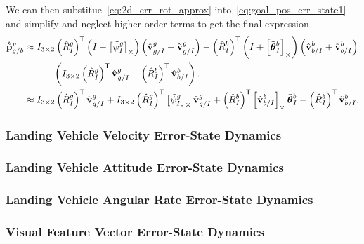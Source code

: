 We can then substitue~\eqref{eq:2d_err_rot_approx}
into~\eqref{eq:goal_pos_err_state1} and simplify and neglect higher-order terms
to get the final expression
\begin{align}
  \dot{\tilde{\boldsymbol{\mathrm{p}}}}_{g/b}^{v}
  &\approx
  \label{eq:goal_pos_err_state1}
  I_{3 \times 2} \left( \hat{R}_{I}^{g} \right)^{\mathsf{T}}
  \left( I - \left[ \tilde{\psi}_I^g \right]_{\times} \right)
  \left( \hat{\boldsymbol{\mathrm{v}}}_{g/I}^{g} + \tilde{\boldsymbol{\mathrm{v}}}_{g/I}^{g} \right)
  - \left( \hat{R}_{I}^{b} \right)^{\mathsf{T}}
  \left( I + \left[ \tilde{\boldsymbol{\mathrm{\theta}}}_I^b \right]_{\times} \right)
  \left( \hat{\boldsymbol{\mathrm{v}}}_{b/I}^{b} + \tilde{\boldsymbol{\mathrm{v}}}_{b/I}^{b} \right) \\
  & \qquad -
  \left(
  I_{3 \times 2} \left( \hat{R}_{I}^{g} \right)^{\mathsf{T}}
  \hat{\boldsymbol{\mathrm{v}}}_{g/I}^{g} - \left( \hat{R}_{I}^{b} \right)^{\mathsf{T}}
  \hat{\boldsymbol{\mathrm{v}}}_{b/I}^{b}
  \right). \nonumber \\
  &\approx
  \label{eq:goal_pos_err_state1}
  I_{3 \times 2} \left( \hat{R}_{I}^{g} \right)^{\mathsf{T}}
  \tilde{\boldsymbol{\mathrm{v}}}_{g/I}^g
  +
  I_{3 \times 2} \left( \hat{R}_{I}^{g} \right)^{\mathsf{T}}
  \left[  \tilde{\psi}_I^g  \right]_{\times} \hat{\boldsymbol{\mathrm{v}}}_{g/I}^g
  +
  \left( \hat{R}_{I}^{b} \right)^{\mathsf{T}} \left[  \hat{\boldsymbol{\mathrm{v}}}_{b/I}^{b}  \right]_{\times} 
  \tilde{\boldsymbol{\mathrm{\theta}}}_I^b
  -
  \left( \hat{R}_{I}^{b} \right)^{\mathsf{T}} \tilde{\boldsymbol{\mathrm{v}}}_{b/I}^{b} .
\end{align}

\subsubsection{Landing Vehicle Velocity Error-State Dynamics}
\subsubsection{Landing Vehicle Attitude Error-State Dynamics}
\subsubsection{Landing Vehicle Angular Rate Error-State Dynamics}
\subsubsection{Visual Feature Vector Error-State Dynamics}

